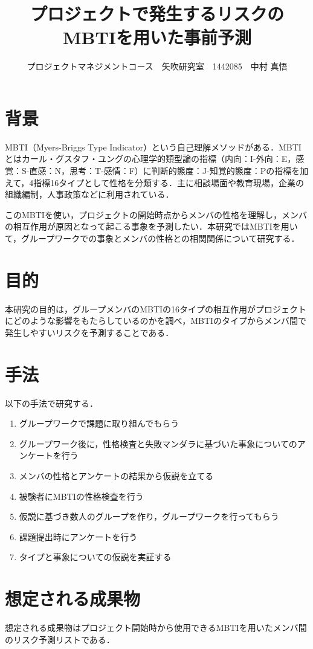 \documentclass[uplatex,twocolumn,dvipdfmx]{jsarticle}
\title{\vspace{-5mm}\fontsize{14pt}{0pt}\selectfont プロジェクトで発生するリスクのMBTIを用いた事前予測}
\author{\normalsize プロジェクトマネジメントコース　矢吹研究室　1442085　中村 真悟}
\date{}
\begin{document}
\fontsize{10.5pt}{\baselineskip}\selectfont
\maketitle






\section{背景}
MBTI（Myers-Briggs Type Indicator）という自己理解メソッドがある．MBTIとはカール・グスタフ・ユングの心理学的類型論の指標（内向：I-外向：E，感覚：S-直感：N，思考：T-感情：F）に判断的態度：J-知覚的態度：Pの指標を加えて，4指標16タイプとして性格を分類する．主に相談場面や教育現場，企業の組織編制，人事政策などに利用されている\cite{110001230195}．

このMBTIを使い，プロジェクトの開始時点からメンバの性格を理解し，メンバの相互作用が原因となって起こる事象を予測したい．本研究ではMBTIを用いて，グループワークでの事象とメンバの性格との相関関係について研究する．

\section{目的}
本研究の目的は，グループメンバのMBTIの16タイプの相互作用がプロジェクトにどのような影響をもたらしているのかを調べ，MBTIのタイプからメンバ間で発生しやすいリスクを予測することである．

\section{手法}
以下の手法で研究する．
\begin{enumerate}
\item グループワークで課題に取り組んでもらう
\item グループワーク後に，性格検査\cite{MBTI}と失敗マンダラ\cite{110009915588}に基づいた事象についてのアンケートを行う
\item メンバの性格とアンケートの結果から仮説を立てる
\item 被験者にMBTIの性格検査を行う
\item 仮説に基づき数人のグループを作り，グループワークを行ってもらう
\item 課題提出時にアンケートを行う
\item タイプと事象についての仮説を実証する
\end{enumerate}
\section{想定される成果物}
想定される成果物はプロジェクト開始時から使用できるMBTIを用いたメンバ間のリスク予測リストである．
\end{document}
